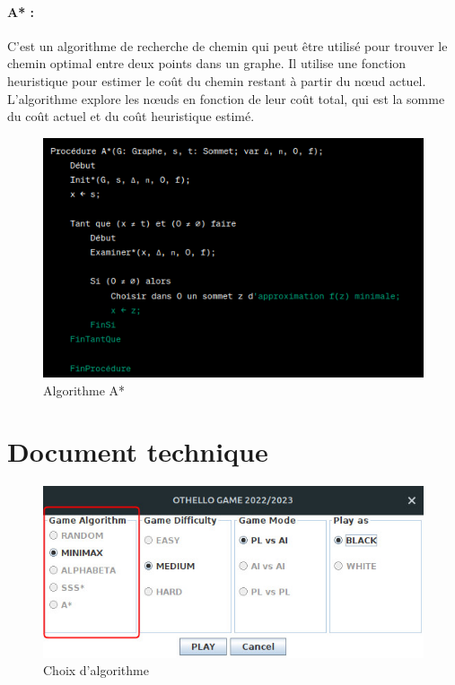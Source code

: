 \documentclass[12pt]{article}
\begin{document}
\paragraph{	A* :} C'est un algorithme de recherche de chemin qui peut être utilisé pour trouver le chemin optimal entre deux points dans un graphe. Il utilise une fonction heuristique pour estimer le coût du chemin restant à partir du nœud actuel. L'algorithme explore les nœuds en fonction de leur coût total, qui est la somme du coût actuel et du coût heuristique estimé.

	\begin{figure}[H]
	\centering
	\includegraphics[scale=0.7]{img/A}
	\caption{Algorithme A* }
	\label{Algorithme A*}
\end{figure}



	


\section{Document technique}
	
		\begin{figure}[H]
		\centering
		\includegraphics[scale=0.7]{img/othello_startAlgo.jpg}
		\caption{Choix d'algorithme }
		\label{Algo}
	\end{figure}
\end{document}
